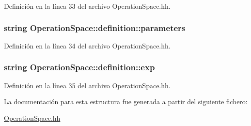 Definición en la línea 33 del archivo Operation\+Space.\+hh.

\subsubsection[{\texorpdfstring{parameters}{parameters}}]{\setlength{\rightskip}{0pt plus 5cm}string Operation\+Space\+::definition\+::parameters}\hypertarget{struct_operation_space_1_1definition_a3df061502e0e42166d31729418994f69}{}\label{struct_operation_space_1_1definition_a3df061502e0e42166d31729418994f69}


Definición en la línea 34 del archivo Operation\+Space.\+hh.

\subsubsection[{\texorpdfstring{exp}{exp}}]{\setlength{\rightskip}{0pt plus 5cm}string Operation\+Space\+::definition\+::exp}\hypertarget{struct_operation_space_1_1definition_af50bcfd1fc8f83f8351ed5ba669c6fc7}{}\label{struct_operation_space_1_1definition_af50bcfd1fc8f83f8351ed5ba669c6fc7}


Definición en la línea 35 del archivo Operation\+Space.\+hh.



La documentación para esta estructura fue generada a partir del siguiente fichero\+:\begin{DoxyCompactItemize}
\item 
\hyperlink{_operation_space_8hh}{Operation\+Space.\+hh}\end{DoxyCompactItemize}
